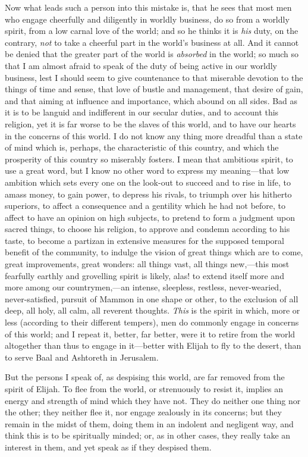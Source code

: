Now what leads such a person into this mistake is, that he sees
that most men who engage cheerfully and diligently in worldly
business, do so from a worldly spirit, from a low carnal love of the
world; and so he thinks it is \emph{his} duty, on the contrary, \emph{not}
to take a cheerful part in the world's business at all. And it cannot
be denied that the greater part of the world is \emph{absorbed} in the
world; so much so that I am almost afraid to speak of the duty of
being active in our worldly business, lest I should seem to give
countenance to that miserable devotion to the things of time and
sense, that love of bustle and management, that desire of gain, and
that aiming at influence and importance, which abound on all sides.
Bad as it is to be languid and indifferent in our secular duties, and
to account this religion, yet it is far worse to be the slaves of this
world, and to have our hearts in the concerns of this world. I do not
know any thing more dreadful than a state of mind which is, perhaps,
the characteristic of this country, and which the prosperity of this
country so miserably fosters. I mean that ambitious spirit, to use a
great word, but I know no other word to express my meaning—that low
ambition which sets every one on the look-out to succeed and to rise
in life, to amass money, to gain power, to depress his rivals, to
triumph over his hitherto superiors, to affect a consequence and a
gentility which he had not before, to affect to have an opinion on
high subjects, to pretend to form a judgment upon sacred things, to
choose his religion, to approve and condemn according to his taste, to
become a partizan in extensive measures for the supposed temporal
benefit of the community, to indulge the vision of great things which
are to come, great improvements, great wonders: all things vast, all
things new,—this most fearfully earthly and grovelling spirit is
likely, alas! to extend itself more and more among our countrymen,—an
intense, sleepless, restless, never-wearied, never-satisfied, pursuit
of Mammon in one shape or other, to the exclusion of all deep, all
holy, all calm, all reverent thoughts. \emph{This} is the spirit in
which, more or less (according to their different tempers), men do
commonly engage in concerns of this world; and I repeat it, better,
far better, were it to retire from the world altogether than thus to
engage in it—better with Elijah to fly to the desert, than to serve
Baal and Ashtoreth in Jerusalem.

But the persons I speak of, as despising this world, are far
removed from the spirit of Elijah. To flee from the world, or
strenuously to resist it, implies an energy and strength of mind which
they have not. They do neither one thing nor the other; they neither
flee it, nor engage zealously in its concerns; but they remain in the
midst of them, doing them in an indolent and negligent way, and think
this is to be spiritually minded; or, as in other cases, they really
take an interest in them, and yet speak as if they despised them.


